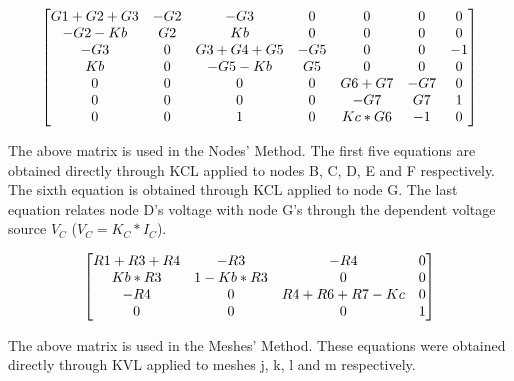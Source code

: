 \begin{equation}
\begin{bmatrix}
\centering
G1+G2+G3 & -G2 & -G3 & 0 & 0 & 0 & 0\\ %
-G2-Kb & G2 & Kb & 0 & 0 & 0 & 0\\ %
-G3 & 0 & G3+G4+G5 & -G5 & 0 & 0 & -1\\ %
Kb & 0 & -G5-Kb & G5 & 0 & 0 & 0\\ %
0 & 0 & 0 & 0 & G6+G7 & -G7 & 0\\ %
0 & 0 & 0 & 0 & -G7 & G7 & 1\\ %
0 & 0 & 1 & 0 & Kc*G6 & -1 & 0 %
\end{bmatrix}
\end{equation}

The above matrix is used in the Nodes' Method. The first five equations are obtained directly through KCL applied to nodes B, C, D, E and F respectively. The sixth equation is obtained through KCL applied to node G. The last equation relates node D's voltage with node G's through the dependent voltage source $V_C$ ($V_C=K_C*I_C$).

\begin{equation}
\begin{bmatrix}
\centering
R1+R3+R4 & -R3 & -R4 & 0\\
Kb*R3 & 1-Kb*R3 & 0 & 0\\
-R4 & 0 & R4+R6+R7-Kc & 0\\
 0 & 0 & 0 & 1
\end{bmatrix}
\end{equation}
\par
\par
The above matrix is used in the Meshes' Method. These equations were obtained directly through KVL applied to meshes j, k, l and m respectively.

\begin{comment}

\begin{table}[h]
  \centering
  \begin{tabular}{|l|r|}
    \hline    
    {\bf Name} & {\bf Value [A or V]} \\ \hline
    
  \end{tabular}
  \caption{Operating point. A variable preceded by @ is of type {\em current}
    and expressed in Ampere; other variables are of type {\it voltage} and expressed in
    Volt.}
  \label{tab:op}
\end{table}

\end{comment}

